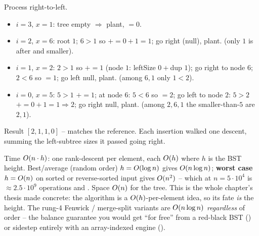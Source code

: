 \begin{tracebox}[Official example \code{nums = [5,2,6,1]}]
Process right-to-left.
\begin{itemize}[nosep,leftmargin=1.3em]
  \item $i=3$, $x=1$: tree empty $\Rightarrow$ plant, $=0$.  \checkmark
  \item $i=2$, $x=6$: root $1$; $6>1$ so $+=0+1=1$; go right (null), plant.
         \checkmark (only $1$ is after and smaller).
  \item $i=1$, $x=2$: $2>1$ so $+=1$ (node $1$: leftSize $0{+}$dup $1$); go right to
        node $6$; $2<6$ so $=1$; go left null, plant.  \checkmark
        (among $6,1$ only $1<2$).
  \item $i=0$, $x=5$: $5>1$ $+=1$; at node $6$: $5<6$ so $=2$; go left to
        node $2$: $5>2$ $+=0+1=1\Rightarrow2$; go right null, plant. 
        \checkmark (among $2,6,1$ the smaller-than-$5$ are $2,1$).
\end{itemize}
Result $[2,1,1,0]$ -- matches the reference. \checkmark Each insertion walked one descent, summing the
left-subtree sizes it passed going right.
\end{tracebox}

\begin{complexitybox}
Time $O(n\cdot h)$: one rank-descent per element, each $O(h)$ where $h$ is the BST height.
Best/average (random order) $h=O(\log n)$ gives $O(n\log n)$; \textbf{worst case} $h=O(n)$
on sorted or reverse-sorted input gives $O(n^2)$ -- which at $n=5\cdot10^{4}$ is $\approx2.5\cdot10^{9}$
operations and \tle. Space $O(n)$ for the tree. This is the whole chapter's thesis made concrete:
the algorithm is a $O(h)$-per-element idea, so its fate \emph{is} the height. The rung-4 Fenwick /
merge-split variants are $O(n\log n)$ \emph{regardless} of order -- the balance guarantee you would
get ``for free'' from a red-black BST () or sidestep entirely with an array-indexed engine
().
\end{complexitybox}

